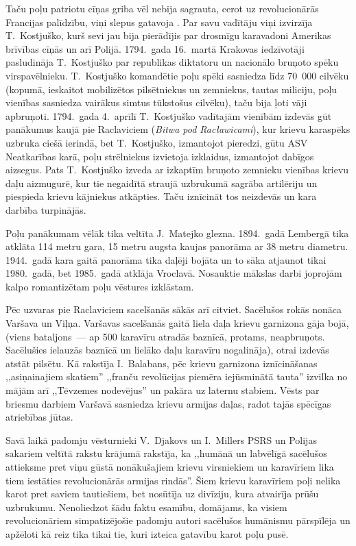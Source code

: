 \documentclass[twoside,a5paper,12pt,fleqn,openany]{extbook}
\newcommand{\pltxti}[1]{\textit{\textpolish{#1}}}
\begin{document}
Taču poļu patriotu cīņas griba vēl nebija sagrauta, cerot uz revolucionārās Francijas palīdzību, viņi slepus gatavoja . Par savu vadītāju viņi izvirzīja T.~Kostjuško, kurš sevi jau bija pierādījis par drosmīgu karavadoni Amerikas brīvības cīņās un arī Polijā. 1794.~gada 16.~martā Krakovas iedzīvotāji pasludināja T.~Kostjuško par republikas diktatoru un nacionālo bruņoto spēku virspavēlnieku. T.~Kostjuško komandētie poļu spēki sasniedza līdz 70~000 cilvēku (kopumā, ieskaitot mobilizētos pilsētniekus un zemniekus, tautas miliciju, poļu vienības sasniedza vairākus simtus tūkstošus cilvēku), taču bija ļoti vāji apbruņoti. 1794.~gada 4.~aprīlī T.~Kostjuško vadītajām vienībām izdevās gūt panākumus kaujā pie Raclaviciem (\pltxti{Bitwa pod Racławicami}), kur krievu karaspēks uzbruka ciešā ierindā, bet T.~Kostjuško, izmantojot pieredzi, gūtu ASV Neatkarības karā, poļu strēlniekus izvietoja izklaidus, izmantojot dabīgos aizsegus. Pats T.~Kostjuško izveda ar izkaptīm bruņoto zemnieku vienības krievu daļu aizmugurē, kur tie negaidītā straujā uzbrukumā sagrāba artilēriju un piespieda krievu kājniekus atkāpties. Taču iznīcināt tos neizdevās un kara darbība turpinājās.

Poļu panākumam vēlāk tika veltīta J.~Matejko glezna. 1894.~gadā Lembergā tika atklāta 114 metru gara, 15 metru augsta kaujas panorāma ar 38 metru diametru. 1944.~gadā kara gaitā panorāma tika daļēji bojāta un to sāka atjaunot tikai 1980.~gadā, bet 1985.~gadā atklāja Vroclavā. Nosauktie mākslas darbi joprojām kalpo romantizētam poļu vēstures izklāstam.

Pēc uzvaras pie Raclaviciem sacelšanās sākās arī citviet. Sacēlušos rokās nonāca Varšava un Viļņa. Varšavas sacelšanās gaitā liela daļa krievu garnizona gāja bojā, (viens bataljons~--- ap 500 karavīru atradās baznīcā, protams, neapbruņots. Sacēlušies ielauzās baznīcā un lielāko daļu karavīru nogalināja), otrai izdevās atstāt pilsētu. Kā rakstīja I.~Balabans, pēc krievu garnizona iznīcināšanas ,,asiņainajiem skatiem'' ,,franču revolūcijas piemēra iejūsminātā tauta'' izvilka no mājām arī ,,Tēvzemes nodevējus'' un pakāra uz laternu stabiem. Vēsts par briesmu darbiem Varšavā sasniedza krievu armijas daļas, radot tajās spēcīgas atriebības jūtas.

Savā laikā padomju vēsturnieki V.~Djakovs un I.~Millers PSRS un Polijas sakariem veltītā rakstu krājumā rakstīja, ka ,,humānā un labvēlīgā sacēlušos attieksme pret viņu gūstā nonākušajiem krievu virsniekiem un karavīriem lika tiem iestāties revolucionārās armijas rindās''. Šiem krievu karavīriem poļi nelika karot pret saviem tautiešiem, bet nosūtīja uz divīziju, kura atvairīja prūšu uzbrukumu. Nenoliedzot šādu faktu esamību, domājams, ka visiem revolucionāriem simpatizējošie padomju autori sacēlušos humānismu pārspīlēja un apžēloti kā reiz tika tikai tie, kuri izteica gatavību karot poļu pusē.
\end{document}
